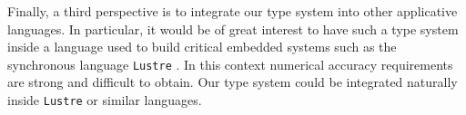 Finally, a third perspective is to integrate our type system into other applicative
languages. In particular, it would be of great interest to have such a type system inside
a language used to build critical embedded systems such as the synchronous language \texttt{Lustre} \cite{Cal87}. 
In this context
numerical accuracy requirements are strong and difficult to obtain.
Our type system could be integrated naturally inside \texttt{Lustre} or similar languages.





